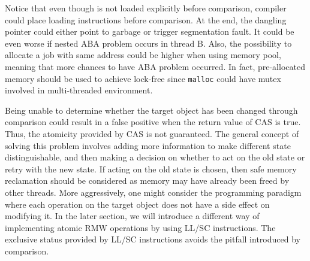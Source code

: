 \documentclass[fontsize=10pt, oneside]{scrartcl}
\newcommand{\monobox}[1]{\mbox{\texttt{#1}}}
\begin{document}
Notice that even though  is not loaded explicitly before comparison, compiler could place loading instructions before comparison. 
At the end, the dangling pointer could either point to garbage or trigger segmentation fault.
It could be even worse if nested ABA problem occurs in thread B.
Also, the possibility to allocate a job with same address could be higher when using memory pool, meaning that more chances to have ABA problem occurred.
In fact, pre-allocated memory should be used to achieve lock-free since \monobox{malloc} could have mutex involved in multi-threaded environment.

Being unable to determine whether the target object has been changed through comparison could result in a false positive when the return value of CAS is true.
Thus, the atomicity provided by CAS is not guaranteed.
The general concept of solving this problem involves adding more information to make different state distinguishable, and then making a decision on whether to act on the old state or retry with the new state.
If acting on the old state is chosen, then safe memory reclamation should be considered as memory may have already been freed by other threads.
More aggressively, one might consider the programming paradigm where each operation on the target object does not have a side effect on modifying it.
In the later section, we will introduce a different way of implementing atomic \textsc{RMW} operations by using LL/SC instructions. The exclusive status provided by LL/SC instructions avoids the pitfall introduced by comparison.
\end{document}
